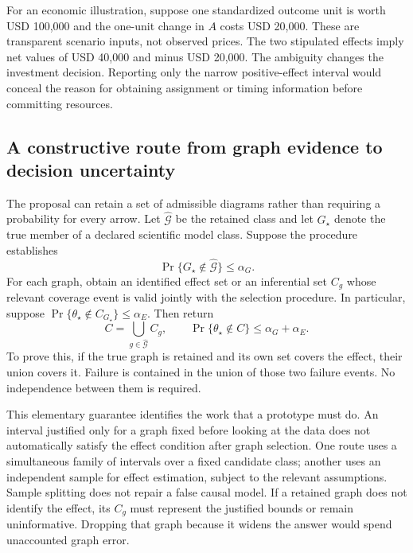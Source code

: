 For an economic illustration, suppose one standardized outcome unit is worth
USD 100,000 and the one-unit change in $A$ costs USD 20,000. These are
transparent scenario inputs, not observed prices. The two stipulated effects
imply net values of USD 40,000 and minus USD 20,000. The ambiguity changes
the investment decision. Reporting only the narrow positive-effect interval
would conceal the reason for obtaining assignment or timing information
before committing resources.

\subsection{A constructive route from graph evidence to decision uncertainty}

The proposal can retain a set of admissible diagrams rather than requiring a
probability for every arrow. Let $\widehat{\mathcal G}$ be the retained class
and let $G_\star$ denote the true member of a declared scientific model class.
Suppose the procedure establishes
\begin{equation}
 \Pr\{G_\star\notin\widehat{\mathcal G}\}\leq\alpha_G.
 \label{closure30:graph-retention-contract}
\end{equation}
For each graph, obtain an identified effect set or an inferential set
$C_g$ whose relevant coverage event is valid jointly with the selection
procedure. In particular, suppose
$\Pr\{\theta_\star\notin C_{G_\star}\}\leq\alpha_E$.
Then return
\begin{equation}
 C=\bigcup_{g\in\widehat{\mathcal G}} C_g,
 \qquad
 \Pr\{\theta_\star\notin C\}\leq\alpha_G+\alpha_E.
 \label{closure30:union-coverage}
\end{equation}
To prove this, if the true graph is retained and its own set covers the
effect, their union covers it. Failure is contained in the union of those
two failure events. No independence between them is required.

This elementary guarantee identifies the work that a prototype must do.
An interval justified only for a graph fixed before looking at the data
does not automatically satisfy the effect condition after graph selection.
One route uses a simultaneous family of intervals over a fixed candidate
class; another uses an independent sample for effect estimation, subject to
the relevant assumptions. Sample splitting does not repair a false causal
model. If a retained graph does not identify the effect, its $C_g$ must
represent the justified bounds or remain uninformative. Dropping that graph
because it widens the answer would spend unaccounted graph error.

